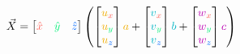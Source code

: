 \documentclass[preview]{standalone}
\begin{document}
$$\vec{X} = \begin{bmatrix}\textcolor[HTML]{fe5e56}{\hat{x}}&\textcolor[HTML]{00ef75}{\hat{y}}&\textcolor[HTML]{0069fe}{\hat{z}}\end{bmatrix}\left(
\begin{bmatrix}\textcolor[HTML]{efac00}{u}_{\textcolor[HTML]{fe5e56}{x}}\\\textcolor[HTML]{efac00}{u}_{\textcolor[HTML]{00ef75}{y}}\\\textcolor[HTML]{efac00}{u}_{\textcolor[HTML]{0069fe}{z}}\end{bmatrix}\textcolor[HTML]{efac00}{a} +
\begin{bmatrix}\textcolor[HTML]{00b4c4}{v}_{\textcolor[HTML]{fe5e56}{x}}\\\textcolor[HTML]{00b4c4}{v}_{\textcolor[HTML]{00ef75}{y}}\\\textcolor[HTML]{00b4c4}{v}_{\textcolor[HTML]{0069fe}{z}}\end{bmatrix}\textcolor[HTML]{00b4c4}{b} +
\begin{bmatrix}\textcolor[HTML]{ba00b2}{w}_{\textcolor[HTML]{fe5e56}{x}}\\\textcolor[HTML]{ba00b2}{w}_{\textcolor[HTML]{00ef75}{y}}\\\textcolor[HTML]{ba00b2}{w}_{\textcolor[HTML]{0069fe}{z}}\end{bmatrix}\textcolor[HTML]{ba00b2}{c}
\right)$$
\end{document}
